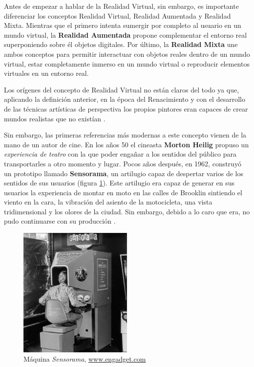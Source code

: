 Antes de empezar a hablar de la Realidad Virtual, sin embargo, es importante diferenciar los conceptos Realidad Virtual, Realidad Aumentada y Realidad Mixta. Mientras que el primero intenta sumergir por completo al usuario en un mundo virtual, la \textbf{Realidad Aumentada} propone complementar el entorno real superponiendo sobre él objetos digitales. Por último, la \textbf{Realidad Mixta}  une ambos conceptos para permitir interactuar con objetos reales dentro de un mundo virtual, estar completamente inmerso en un mundo virtual o reproducir elementos virtuales en un entorno real.

Los orígenes del concepto de Realidad Virtual no están claros del todo ya que, aplicando la definición anterior, en la época del Renacimiento y con el desarrollo de las técnicas artísticas de perspectiva los propios pintores eran capaces de crear mundos realistas que no existían \cite{schn-17}. 

Sin embargo, las primeras referencias más modernas a este concepto vienen de la mano de un autor de cine. En los años 50 el cineasta \textbf{Morton Heilig} propuso un \textit{experiencia de teatro} con la que poder engañar a los sentidos del  público para transportarles a otro momento y lugar. Pocos años después, en 1962, construyó un prototipo llamado \textbf{Sensorama}, un artilugio capaz de despertar varios de los sentidos de sus usuarios (figura \ref{fig:sensorama}). Este artilugio era capaz de generar en sus usuarios la experiencia de montar en moto en las calles de Brooklin sintiendo el viento en la cara, la vibración del asiento de la motocicleta, una vista tridimensional y los olores de la ciudad. Sin embargo, debido a lo caro que era, no pudo continuarse con su producción \cite{brock-16}.

\vspace{0.2cm}

\begin{figure}[!h]
    \begin{center}
        \includegraphics[width=0.5\textwidth]{imagenes/2/sensorama.jpg}
        \caption{Máquina \textit{Sensorama}, \url{www.engadget.com}}
        \label{fig:sensorama}
    \end{center}
\end{figure}

